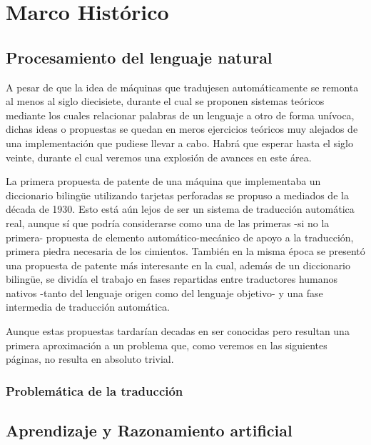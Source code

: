 \chapter{Marco Histórico}
\label{chap:marco}
\section{Procesamiento del lenguaje natural}

A pesar de que la idea de máquinas que tradujesen automáticamente se remonta al
menos al siglo diecisiete, durante el cual se proponen sistemas teóricos mediante los
cuales relacionar palabras de un lenguaje a otro de forma unívoca, dichas ideas
o propuestas se quedan en meros ejercicios teóricos muy alejados de una
implementación que pudiese llevar a cabo. Habrá que esperar hasta el siglo
veinte, durante el cual veremos una explosión de avances en este área.

La primera propuesta de patente de una máquina que implementaba un diccionario
bilingüe utilizando tarjetas perforadas se propuso a mediados de la década de
1930. Esto está aún lejos de ser un sistema de traducción automática real,
aunque sí que podría considerarse como una de las primeras -si no la primera-
propuesta de elemento automático-mecánico de apoyo a la traducción, primera
piedra necesaria de los cimientos.
También en la misma época se presentó una propuesta de patente más interesante
en la cual, además de un diccionario bilingüe, se dividía el trabajo en fases
repartidas entre traductores humanos nativos -tanto del lenguaje origen como del
lenguaje objetivo- y una fase intermedia de traducción automática.

Aunque estas propuestas tardarían decadas en ser conocidas pero resultan una
primera aproximación a un problema que, como veremos en las siguientes páginas,
no resulta en absoluto trivial.

\subsection{Problemática de la traducción}

\section{Aprendizaje y Razonamiento artificial}



